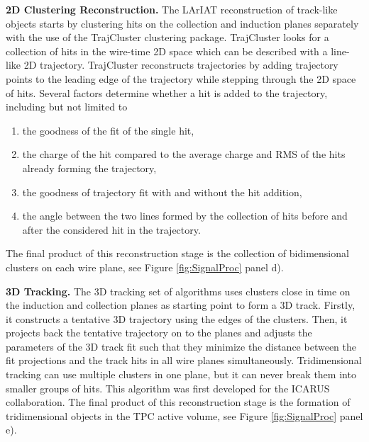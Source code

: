 \documentclass[aps,prl,twocolumn,showpacs,superscriptaddress,groupedaddress]{revtex4}  %
\begin{document}
\textbf{2D Clustering Reconstruction.} 
The LArIAT reconstruction of track-like objects starts by clustering hits on the collection and induction planes separately with the use of the TrajCluster clustering package\cite{Baller2016}. 
TrajCluster looks for a collection of hits in the wire-time 2D space which can be described with a line-like 2D trajectory. TrajCluster reconstructs trajectories by adding trajectory points to the leading edge of the trajectory while stepping through the 2D space of hits. Several factors determine whether a hit is added to the trajectory, including but not limited to
\begin{enumerate}
\item the goodness of the fit of the single hit,
\item the charge of the hit compared to the average charge and RMS of the hits already forming the trajectory,
\item the goodness of trajectory fit with and without the hit addition,
\item the angle between the two lines formed by the collection of hits before and after the considered hit in the trajectory.
\end{enumerate}
The final product of this reconstruction stage is the collection of bidimensional clusters on each wire plane, see Figure \ref{fig:SignalProc} panel d).

\textbf{3D Tracking.} The 3D tracking set of algorithms uses clusters close in time on the induction and collection planes as starting point to form a 3D track. Firstly, it constructs a tentative 3D trajectory using the edges of the clusters. Then, it  projects back the tentative trajectory on to the planes and adjusts the parameters of the 3D track fit such that they minimize the distance between the fit projections and the track hits in all wire planes simultaneously.  Tridimensional tracking can use multiple clusters in one plane, but it can never break them into smaller groups of hits. This algorithm was first developed for the ICARUS collaboration\cite{Antonello2013}. The final product of this reconstruction stage is the formation of  tridimensional objects in the TPC active volume, see Figure \ref{fig:SignalProc} panel e).\\
\end{document}
